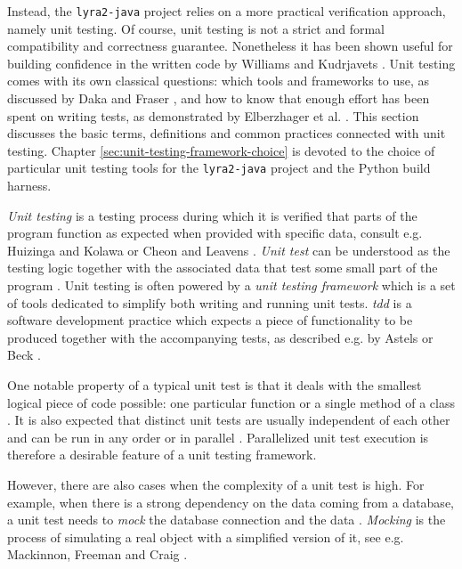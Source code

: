 Instead, the \texttt{lyra2-java} project relies on a more practical verification approach, namely unit testing. Of course, unit testing is not a strict and formal compatibility and correctness guarantee. Nonetheless it has been shown useful for building confidence in the written code by Williams and Kudrjavets \cite{williams:2010:unit-tests-rock}. Unit testing comes with its own classical questions: which tools and frameworks to use, as discussed by Daka and Fraser \cite{daka:2014:unit-testing-tools}, and how to know that enough effort has been spent on writing tests, as demonstrated by Elberzhager et al. \cite{elberzhager:2012:reducing-effort}. This section discusses the basic terms, definitions and common practices connected with unit testing. Chapter \ref{sec:unit-testing-framework-choice} is devoted to the choice of particular unit testing tools for the \texttt{lyra2-java} project and the Python build harness.

\emph{Unit testing} is a testing process during which it is verified that parts of the program function as expected when provided with specific data, consult e.g. Huizinga and Kolawa \cite{huizinga:2007:automated-defect-prevention} or Cheon and Leavens \cite{cheon2002simple}. \emph{Unit test} can be understood as the testing logic together with the associated data that test some small part of the program \cite{huizinga:2007:automated-defect-prevention}. Unit testing is often powered by a \emph{unit testing framework} which is a set of tools dedicated to simplify both writing and running unit tests. \emph{\Gls{tdd}} is a software development practice which expects a piece of functionality to be produced together with the accompanying tests, as described e.g. by Astels \cite{Astels:2003:TDD:864016} or Beck \cite{beck:2003:tdde}.

One notable property of a typical unit test is that it deals with the smallest logical piece of code possible: one particular function or a single method of a class \cite{beck:2003:tdde}. It is also expected that distinct unit tests are usually independent of each other and can be run in any order or in parallel \cite{beck:2003:tdde}. Parallelized unit test execution is therefore a desirable feature of a unit testing framework.

However, there are also cases when the complexity of a unit test is high. For example, when there is a strong dependency on the data coming from a database, a unit test needs to \emph{mock} the database connection and the data \cite{beck:2003:tdde}. \emph{Mocking} is the process of simulating a real object with a simplified version of it, see e.g. Mackinnon, Freeman and Craig \cite{mackinnon:2001:endo-testing}.

